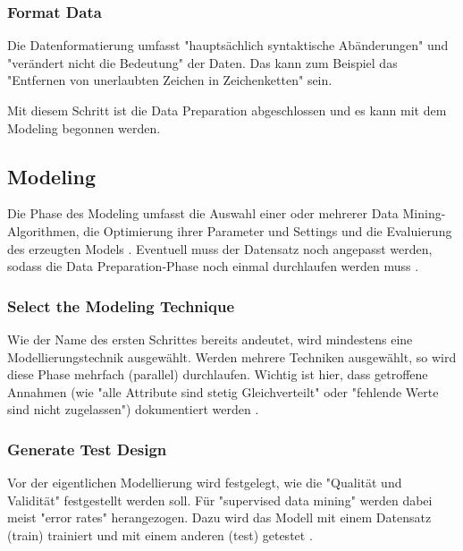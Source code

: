 \subsubsection{Format Data}
Die Datenformatierung umfasst "hauptsächlich syntaktische Abänderungen" und "verändert nicht die Bedeutung"\citep[S.~22; eigene Übersetzung]{chapman_crisp-dm_2000} der Daten. Das kann zum Beispiel das "Entfernen von unerlaubten Zeichen in Zeichenketten"\citep[S.~17; eigene Übersetzung]{shearer_crisp-dm_2000} sein.\par
Mit diesem Schritt ist die Data Preparation abgeschlossen und es kann mit dem Modeling begonnen werden.

\subsection{Modeling}
Die Phase des Modeling umfasst die Auswahl einer oder mehrerer Data Mining-Algorithmen, die Optimierung ihrer Parameter und Settings und die Evaluierung des erzeugten Models . Eventuell muss der Datensatz noch angepasst werden, sodass die Data Preparation-Phase noch einmal durchlaufen werden muss \citep[Punkt 1.4.1.4]{larose_discovering_2014}.

\subsubsection{Select the Modeling Technique}
Wie der Name des ersten Schrittes bereits andeutet, wird mindestens eine Modellierungstechnik ausgewählt. Werden mehrere Techniken ausgewählt, so wird diese Phase mehrfach (parallel) durchlaufen. Wichtig ist hier, dass getroffene Annahmen (wie "alle Attribute sind stetig Gleichverteilt" oder "fehlende Werte sind nicht zugelassen"\citep[S.~24]{chapman_crisp-dm_2000}) dokumentiert werden \citep[S.~17]{shearer_crisp-dm_2000}.

\subsubsection{Generate Test Design}
Vor der eigentlichen Modellierung wird festgelegt, wie die "Qualität und Validität"\citep[S.~24]{chapman_crisp-dm_2000} festgestellt werden soll. Für "supervised data mining" werden dabei meist "error rates"\citep[S.~24]{chapman_crisp-dm_2000} herangezogen. Dazu wird das Modell mit einem Datensatz (\gls{train}) trainiert und mit einem anderen (\gls{test}) getestet \citep{shearer_crisp-dm_2000}.

